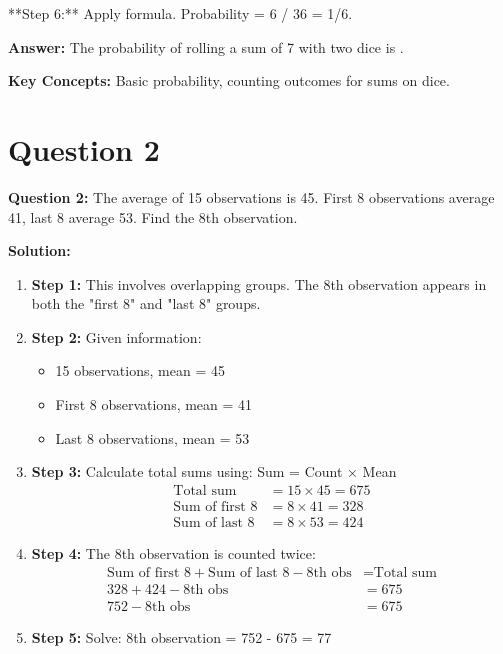 \documentclass[12pt]{article}
\begin{document}
**Step 6:** Apply formula. Probability = 6 / 36 = 1/6.

\textbf{Answer:} The probability of rolling a sum of 7 with two dice is .

\textbf{Key Concepts:} Basic probability, counting outcomes for sums on dice.
\newpage

\section{Question 2}

\textbf{Question 2:} The average of 15 observations is 45. First 8 observations average 41, last 8 average 53. Find the 8th observation.

\textbf{Solution:}
\begin{enumerate}
\item \textbf{Step 1:} This involves overlapping groups. The 8th observation appears in both the "first 8" and "last 8" groups.

\item \textbf{Step 2:} Given information:
\begin{itemize}
\item 15 observations, mean = 45
\item First 8 observations, mean = 41
\item Last 8 observations, mean = 53
\end{itemize}

\item \textbf{Step 3:} Calculate total sums using: Sum = Count × Mean
\begin{align}
\text{Total sum} &= 15 \times 45 = 675 \\
\text{Sum of first 8} &= 8 \times 41 = 328 \\
\text{Sum of last 8} &= 8 \times 53 = 424
\end{align}

\item \textbf{Step 4:} The 8th observation is counted twice:
\begin{align}
\text{Sum of first 8} + \text{Sum of last 8} - \text{8th obs} &= \text{Total sum} \\
328 + 424 - \text{8th obs} &= 675 \\
752 - \text{8th obs} &= 675
\end{align}

\item \textbf{Step 5:} Solve: 8th observation = 752 - 675 = 77
\end{enumerate}
\end{document}
